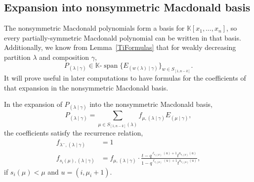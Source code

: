 \documentclass[ALCO]{cedram}
\newcommand{\Lq}{\mathbb{K}}
\newcommand{\Spann}{\text{-}\operatorname{span}}
\newcommand{\Sn}{S_{[1,n-k]}}
\newcommand{\PP}{P_{(\lambda \mid \gamma)}}
\newcommand{\Pn}{P_{(\lambda \mid \gamma)}}
\newcommand{\nudom}{{( \lambda \mid \gamma )}}
\newcommand{\lambdagamma}{{\nudom}}
\newcommand{\mugamma}{{(\mu \mid \gamma)}}
\newcommand{\fmu}{f_{\mu,\lambdagamma}}
\newcommand{\fsimu}{{f_{s_i(\mu),\lambdagamma}}}
\newcommand{\betaa}{{q^{\ell_{s_i(\mu)}(u)+1} t^{a_{s_i(\mu)}(u)}}}
\begin{document}
\subsection{Expansion into nonsymmetric Macdonald basis}
The nonsymmetric Macdonald polynomials form a basis for $\Lq[x_1, \dotsc, x_n]$, so every partially-symmetric Macdonald polynomial can be written in that basis. Additionally, we know from Lemma~\ref{TiFormulas} that for weakly decreasing partition $\lambda$ and composition $\gamma$,
\[ \Pn \in \Lq \Spann \{ E_{(w(\lambda) \mid \gamma)}\}_{w\in \Sn }.\]
It will prove useful in later computations to have formulas for the coefficients of that expansion in the nonsymmetric Macdonald basis.


\begin{prop}\label{Pexpansion}
In the expansion of $\PP$ into the nonsymmetric Macdonald basis,
\[ \PP = \sum_{\mu \in S_{[1,n-k]}(\lambda)} \fmu E_{\mugamma},\]
the coefficients satisfy the recurrence relation,
\begin{align} 
f_{\lambda^-,\lambdagamma} &= 1 \label{identity}\\
\fsimu &= \fmu \cdot \frac{t-\betaa}{1-\betaa},\label{recursion}\end{align}
if $s_i(\mu) < \mu$ and $u=(i, \mu_{i}+1)$.
\end{prop}
\end{document}
